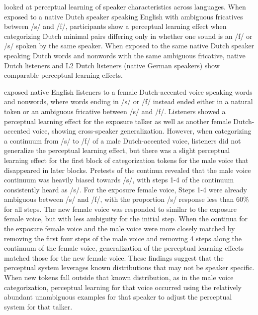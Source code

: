 \citet{Reinisch2013} looked at perceptual learning of speaker characteristics across languages.  
When exposed to a native Dutch speaker speaking English with ambiguous fricatives between /s/ and /f/, participants show a perceptual learning effect when categorizing Dutch minimal pairs differing only in whether one sound is an /f/ or /s/ spoken by the same speaker.  
When exposed to the same native Dutch speaker speaking Dutch words and nonwords with the same ambiguous fricative, native Dutch listeners and L2 Dutch listeners (native German speakers) show comparable perceptual learning effects.

\citet{Reinisch2013a} exposed native English listeners to a female Dutch-accented voice speaking words and nonwords, where words ending in /s/ or /f/ instead ended either in a natural token or an ambiguous fricative between /s/ and /f/.  
Listeners showed a perceptual learning effect for the exposure talker as well as another female Dutch-accented voice, showing cross-speaker generalization.  
However, when categorizing a continuum from /s/ to /f/ of a male Dutch-accented voice, listeners did not generalize the perceptual learning effect, but there was a slight perceptual learning effect for the first block of categorization tokens for the male voice that disappeared in later blocks.  
Pretests of the continua revealed that the male voice continuum was heavily biased towards /s/, with steps 1-4 of the continuum consistently heard as /s/. 
For the exposure female voice, Steps 1-4 were already ambiguous between /s/ and /f/, with the proportion /s/ response less than 60\% for all steps.  
The new female voice was responded to similar to the exposure female voice, but with less ambiguity for the initial step.  
When the continua for the exposure female voice and the male voice were more closely matched by removing the first four steps of the male voice and removing 4 steps along the continuum of the female voice, generalization of the perceptual learning effects matched those for the new female voice.  
These findings suggest that the perceptual system leverages known distributions that may not be speaker specific.  
When new tokens fall outside that known distribution, as in the male voice categorization, perceptual learning for that voice occurred using the relatively abundant unambiguous examples for that speaker to adjust the perceptual system for that talker.

